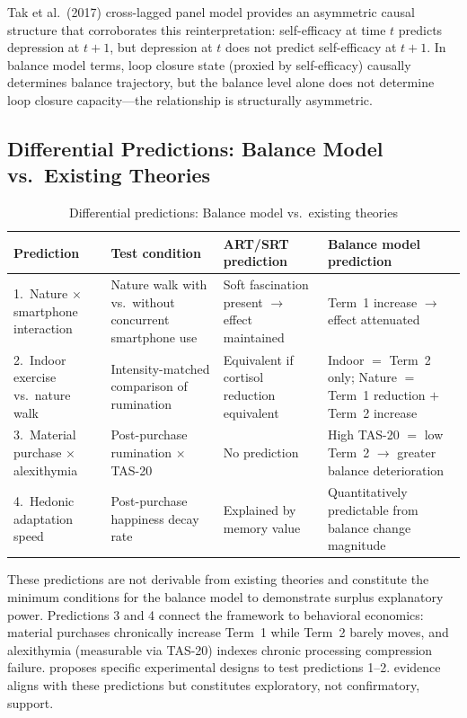 \documentclass[a4paper,11pt,titlepage]{article}
\begin{document}
Tak et al.~(2017) cross-lagged panel model provides an asymmetric causal structure that corroborates this reinterpretation: self-efficacy at time $t$ predicts depression at $t+1$, but depression at $t$ does not predict self-efficacy at $t+1$. In balance model terms, loop closure state (proxied by self-efficacy) causally determines balance trajectory, but the balance level alone does not determine loop closure capacity---the relationship is structurally asymmetric.


\subsection{Differential Predictions: Balance Model vs.\ Existing Theories}\label{sec:differential}

\begin{table}[htbp]
\centering
\caption{Differential predictions: Balance model vs.\ existing theories}
\label{tab:differential}
\small
\begin{tabular}{p{3.2cm}p{3.2cm}p{3.2cm}p{3.2cm}}
\toprule
Prediction & Test condition & ART/SRT prediction & Balance model prediction \\
\midrule
1.~Nature $\times$ smartphone interaction & Nature walk with vs.\ without concurrent smartphone use & Soft fascination present $\to$ effect maintained & Term~1 increase $\to$ effect attenuated \\[3pt]
2.~Indoor exercise vs.\ nature walk & Intensity-matched comparison of rumination & Equivalent if cortisol reduction equivalent & Indoor $=$ Term~2 only; Nature $=$ Term~1 reduction $+$ Term~2 increase \\[3pt]
3.~Material purchase $\times$ alexithymia & Post-purchase rumination $\times$ TAS-20 & No prediction & High TAS-20 $=$ low Term~2 $\to$ greater balance deterioration \\[3pt]
4.~Hedonic adaptation speed & Post-purchase happiness decay rate & Explained by memory value & Quantitatively predictable from balance change magnitude \\
\bottomrule
\end{tabular}
\end{table}

These predictions are not derivable from existing theories and constitute the minimum conditions for the balance model to demonstrate surplus explanatory power. Predictions 3 and 4 connect the framework to behavioral economics: material purchases chronically increase Term~1 while Term~2 barely moves, and alexithymia (measurable via TAS-20) indexes chronic processing compression failure.  proposes specific experimental designs to test predictions 1--2.  evidence aligns with these predictions but constitutes exploratory, not confirmatory, support.
\end{document}
